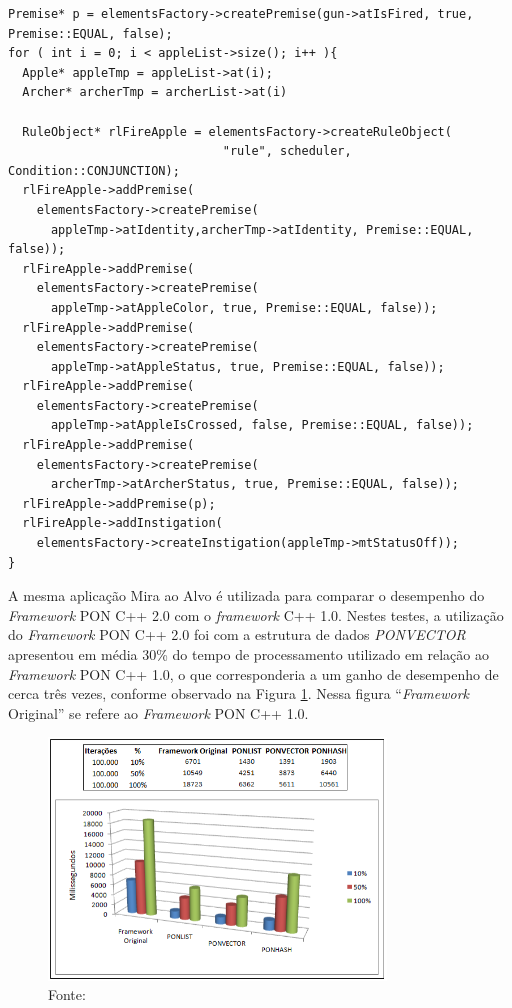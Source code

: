 \begin{lstlisting}[caption = {Exemplo de programa com o \textit{framework} C++ 2.0},
source = {Adaptado de \citeonline{msc_valenca_2012}},
  label = {cod:fw2_ex}, float=htb]
Premise* p = elementsFactory->createPremise(gun->atIsFired, true, Premise::EQUAL, false);
for ( int i = 0; i < appleList->size(); i++ ){
  Apple* appleTmp = appleList->at(i);
  Archer* archerTmp = archerList->at(i)

  RuleObject* rlFireApple = elementsFactory->createRuleObject(
                              "rule", scheduler, Condition::CONJUNCTION);
  rlFireApple->addPremise(
    elementsFactory->createPremise(
      appleTmp->atIdentity,archerTmp->atIdentity, Premise::EQUAL, false));
  rlFireApple->addPremise(
    elementsFactory->createPremise(
      appleTmp->atAppleColor, true, Premise::EQUAL, false));
  rlFireApple->addPremise(
    elementsFactory->createPremise(
      appleTmp->atAppleStatus, true, Premise::EQUAL, false));
  rlFireApple->addPremise(
    elementsFactory->createPremise(
      appleTmp->atAppleIsCrossed, false, Premise::EQUAL, false));
  rlFireApple->addPremise(
    elementsFactory->createPremise(
      archerTmp->atArcherStatus, true, Premise::EQUAL, false));
  rlFireApple->addPremise(p);
  rlFireApple->addInstigation(
    elementsFactory->createInstigation(appleTmp->mtStatusOff));
}
\end{lstlisting}

\FloatBarrier

A mesma aplicação Mira ao Alvo é utilizada para comparar o desempenho do
\textit{Framework} PON C++ 2.0 com o \textit{framework} C++ 1.0. Nestes testes, a
utilização do \textit{Framework} PON C++ 2.0 foi com a estrutura de dados
\textit{PONVECTOR} apresentou em média 30\% do tempo de processamento utilizado
em relação ao \textit{Framework} PON C++ 1.0, o que corresponderia a um ganho de
desempenho de cerca três vezes, conforme observado na Figura
\ref{fig:fw2_vs_fw1}. Nessa figura \enquote{\textit{Framework} Original} se refere  ao
\textit{Framework} PON C++ 1.0.

\begin{figure}[!htb]
  \centering
  \includegraphics[width=0.8\textwidth]{../figures/fw2_vs_fw1.png}
  \caption{Comparação do desempenho do \textit{Framework} PON C++ 2.0 com o
  \textit{Framework} PON C++ 1.0}
  \caption*{Fonte: }
  \label{fig:fw2_vs_fw1}
\end{figure}

